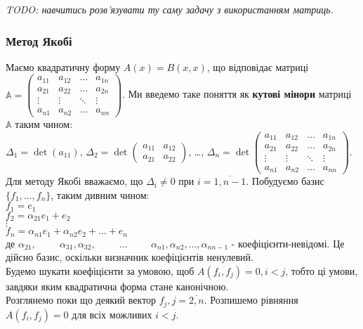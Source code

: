 \documentclass[a4paper, 10pt]{article}
\theoremstyle{theoremdd}
\theoremstyle{theoremdd}
\theoremstyle{theoremdd}
\theoremstyle{theoremdd}
\theoremstyle{theoremdd}
\theoremstyle{theoremdd}
\theoremstyle{theoremdd}
\theoremstyle{theoremdd}
\begin{document}
\textit{TODO: навчитись розв'язувати ту саму задачу з використанням матриць.}

\subsubsection*{Метод Якобі}
Маємо квадратичну форму $A(x) = B(x,x)$, що відповідає матриці $\mathbb{A} = \begin{pmatrix}
a_{11} & a_{12} & \dots & a_{1n} \\
a_{21} & a_{22} & \dots & a_{2n} \\
\vdots & \vdots & \ddots & \vdots \\
a_{n1} & a_{n2} & \dots & a_{nn} 
\end{pmatrix}$. Ми введемо таке поняття як \textbf{кутові мінори} матриці $\mathbb{A}$ таким чином:\\
$\Delta_1 = \det (a_{11})$, $\Delta_2 = \det \begin{pmatrix}
a_{11} & a_{12} \\
a_{21} & a_{22}
\end{pmatrix}$, \dots, $\Delta_n = \det \begin{pmatrix}
a_{11} & a_{12} & \dots & a_{1n} \\
a_{21} & a_{22} & \dots & a_{2n} \\
\vdots & \vdots & \ddots & \vdots \\
a_{n1} & a_{n2} & \dots & a_{nn} 
\end{pmatrix}$.\\
Для методу Якобі вважаємо, що $\Delta_i \neq 0$ при $i = \overline{1,n-1}$. Побудуємо базис $\{f_1,\dots,f_n\}$, таким дивним чином:\\
$f_1 = e_1$\\
$f_2 = \alpha_{21}e_1 + e_2$\\
$\vdots$\\
$f_n = \alpha_{n1}e_1 + \alpha_{n2}e_2 + \dots + e_n$\\
де $\alpha_{21}, \hspace{1cm} \alpha_{31}, \alpha_{32}, \hspace{1cm} \dots \hspace{1cm} \alpha_{n1}, \alpha_{n2}, \dots, \alpha_{nn-1}$ - коефіцієнти-невідомі.
Це дійсно базис, оскільки визначник коефіцієнтів ненулевий.\\
Будемо шукати коефіцієнти за умовою, щоб $A(f_i,f_j) = 0, i < j$, тобто ці умови, завдяки яким квадратична форма стане канонічною.\\
Розглянемо поки що деякий вектор $f_j, j = \overline{2,n}$. Розпишемо рівняння $A(f_i,f_j) = 0$ для всіх можливих $i < j$.\\
\end{document}
